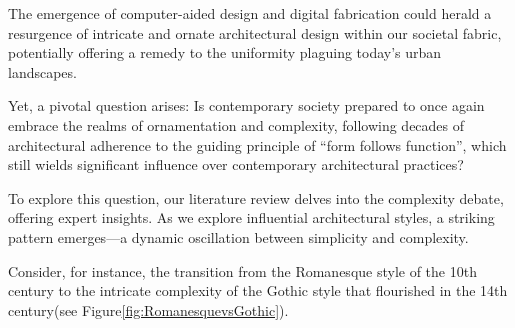 


The emergence of computer-aided design and digital fabrication could herald a resurgence of intricate and ornate architectural design within our societal fabric, potentially offering a remedy to the uniformity plaguing today's urban landscapes.

Yet, a pivotal question arises: Is contemporary society prepared to once again embrace the realms of ornamentation and complexity, following decades of architectural adherence to the guiding principle of ``form follows function''\cite{Gage2015}, which still wields significant influence over contemporary architectural practices?

To explore this question, our literature review delves into the complexity debate, offering expert insights.
As we explore influential architectural styles, a striking pattern emerges—a dynamic oscillation between simplicity and complexity.

Consider, for instance, the transition from the Romanesque style of the 10th century to the intricate complexity of the Gothic style that flourished in the 14th century\cite{Arora2023}(see Figure\ref{fig:RomanesquevsGothic}).


